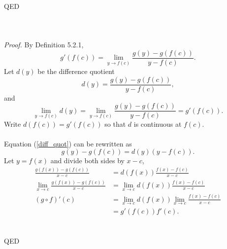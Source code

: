 \documentclass{article}
\begin{document}
            QED
            \\ \\
            \\ \\
            \textit{Proof.} By Definition 5.2.1, 
            \begin{equation*}
                g'(f(c)) = \lim_{y \to f(c)}\frac{g(y)-g(f(c))}{y-f(c)}.
            \end{equation*}
            Let $d(y)$ be the difference quotient
            \begin{equation}
                d(y) = \frac{g(y)-g(f(c))}{y-f(c)},
            \label{diff_quot}
            \end{equation}
            and 
            \begin{equation*}
                \lim_{y \to f(c)} d(y) = \lim_{y \to f(c)} \frac{g(y)-g(f(c))}{y-f(c)} = g'(f(c)).
            \end{equation*}
            Write $d(f(c)) = g'(f(c))$ so that $d$ is continuous at $f(c)$.
            \\ \\
            Equation (\ref{diff_quot}) can be rewritten as
            \begin{equation}
                g(y)-g(f(c)) = d(y)(y-f(c)).
            \end{equation}
            Let $y = f(x)$ and divide both sides by $x-c$,
            \begin{align*}
                \frac{g(f(x))-g(f(c))}{x-c} & = d(f(x)) \frac{f(x)-f(c)}{x-c} \\
                \lim_{x \to c} \frac{g(f(x))-g(f(c))}{x-c} & = \lim_{x \to c} d(f(x)) \frac{f(x)-f(c)}{x-c} \\
                (g \circ f)'(c) & = \lim_{x \to c} d(f(x)) \lim_{x \to c} \frac{f(x)-f(c)}{x-c} \\
                & = g'(f(c))  f'(c).
            \end{align*}
            \\ \\
            QED
            
\end{document}
